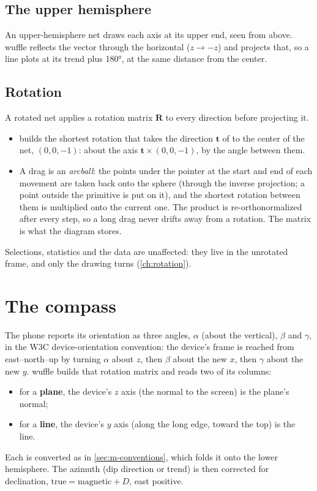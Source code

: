 \subsection{The upper hemisphere}

An upper-hemisphere net draws each axis at its upper end, seen from above. wuffle reflects the vector
through the horizontal ($z \to -z$) and projects that, so a line plots at its trend plus 180°, at the
same distance from the center.

\subsection{Rotation}\label{sec:m-rotation}

A rotated net applies a rotation matrix $\mathbf{R}$ to every direction before projecting it.
\begin{itemize}
\item {} builds the shortest rotation that takes the direction $\mathbf{t}$ of
 to the center of the net, $(0, 0, -1)$: about the axis $\mathbf{t} \times (0,0,-1)$, by the
angle between them.
\item A drag is an \emph{arcball}: the points under the pointer at the start and end of each movement
are taken back onto the sphere (through the inverse projection; a point outside the primitive is put on
it), and the shortest rotation between them is multiplied onto the current one. The product is
re-orthonormalized after every step, so a long drag never drifts away from a rotation. The matrix is
what the diagram stores.
\end{itemize}
Selections, statistics and the data are unaffected: they live in the unrotated frame, and only the
drawing turns (\cref{ch:rotation}).

\section{The compass}\label{sec:m-compass}

The phone reports its orientation as three angles, $\alpha$ (about the vertical), $\beta$ and $\gamma$,
in the W3C device-orientation convention: the device's frame is reached from east--north--up by turning
$\alpha$ about $z$, then $\beta$ about the new $x$, then $\gamma$ about the new $y$. wuffle builds that
rotation matrix and reads two of its columns:
\begin{itemize}
\item for a \textbf{plane}, the device's $z$ axis (the normal to the screen) is the plane's normal;
\item for a \textbf{line}, the device's $y$ axis (along the long edge, toward the top) is the line.
\end{itemize}
Each is converted as in \cref{sec:m-conventions}, which folds it onto the lower hemisphere. The azimuth
(dip direction or trend) is then corrected for declination, $\mathrm{true} = \mathrm{magnetic} + D$, east
positive.

